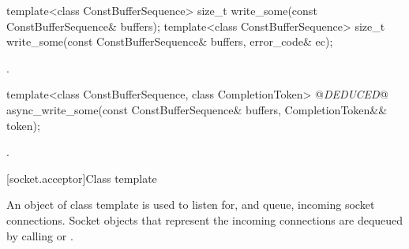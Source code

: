 \begin{itemdecl}
template<class ConstBufferSequence>
  size_t write_some(const ConstBufferSequence& buffers);
template<class ConstBufferSequence>
  size_t write_some(const ConstBufferSequence& buffers,
                    error_code& ec);
\end{itemdecl}

\begin{itemdescr}
\pnum
\returns {}.
\end{itemdescr}

\begin{itemdecl}
template<class ConstBufferSequence, class CompletionToken>
  @\textit{DEDUCED}@ async_write_some(const ConstBufferSequence& buffers,
                           CompletionToken&& token);
\end{itemdecl}

\begin{itemdescr}
\pnum
\returns {}.
\end{itemdescr}




[socket.acceptor]{Class template }

\pnum
An object of class template  is used to listen for, and queue, incoming socket connections. Socket objects that represent the incoming connections are dequeued by calling  or .

